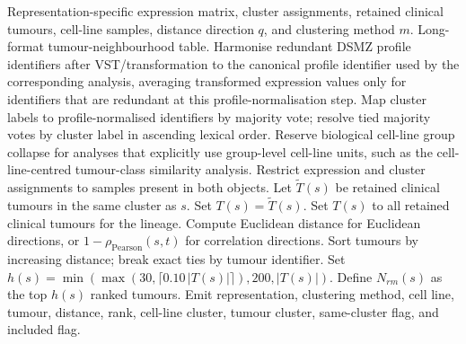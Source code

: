 \begin{algorithm}[H]
\caption{Adaptive cell-line-to-tumour neighbourhood inference}
\label{alg:supp_tumour_neighbourhood_inference}
\small
\begin{algorithmic}[1]
\Require Representation-specific expression matrix, cluster assignments, retained clinical tumours, cell-line samples, distance direction \(q\), and clustering method \(m\).
\Ensure Long-format tumour-neighbourhood table.
\State Harmonise redundant DSMZ profile identifiers after VST/transformation to the canonical profile identifier used by the corresponding analysis, averaging transformed expression values only for identifiers that are redundant at this profile-normalisation step.
\State Map cluster labels to profile-normalised identifiers by majority vote; resolve tied majority votes by cluster label in ascending lexical order.
\State Reserve biological cell-line group collapse for analyses that explicitly use group-level cell-line units, such as the cell-line-centred tumour-class similarity analysis.
\State Restrict expression and cluster assignments to samples present in both objects.
  \State Let \(\widetilde{T}(s)\) be retained clinical tumours in the same cluster as \(s\).
    \State Set \(T(s)=\widetilde{T}(s)\).
  \Else
    \State Set \(T(s)\) to all retained clinical tumours for the lineage.
  \EndIf
  \State Compute Euclidean distance for Euclidean directions, or \(1-\rho_{\mathrm{Pearson}}(s,t)\) for correlation directions.
  \State Sort tumours by increasing distance; break exact ties by tumour identifier.
  \State Set \(h(s)=\min(\max(30,\lceil0.10\,|T(s)|\rceil),200,|T(s)|)\).
  \State Define \(N_{rm}(s)\) as the top \(h(s)\) ranked tumours.
  \State Emit representation, clustering method, cell line, tumour, distance, rank, cell-line cluster, tumour cluster, same-cluster flag, and included flag.
\EndFor
\end{algorithmic}
\end{algorithm}

